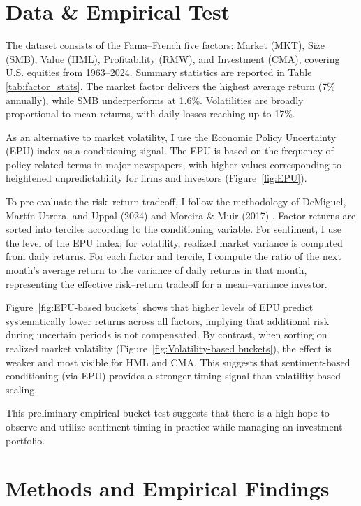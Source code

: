 \chapter{Data \& Empirical Test}

The dataset consists of the Fama–French five factors: Market (MKT), Size (SMB), Value (HML), Profitability (RMW), and Investment (CMA), covering U.S. equities from 1963–2024. Summary statistics are reported in Table \ref{tab:factor_stats}. The market factor delivers the highest average return (7\% annually), while SMB underperforms at 1.6\%. Volatilities are broadly proportional to mean returns, with daily losses reaching up to 17\%.

As an alternative to market volatility, I use the Economic Policy Uncertainty (EPU) index as a conditioning signal. The EPU is based on the frequency of policy-related terms in major newspapers, with higher values corresponding to heightened unpredictability for firms and investors (Figure~\ref{fig:EPU}).

To pre-evaluate the risk–return tradeoff, I follow the methodology of DeMiguel, Martín-Utrera, and Uppal (2024) and Moreira \& Muir (2017) \citep{moreira2017, demiguel2024}. Factor returns are sorted into terciles according to the conditioning variable. For sentiment, I use the level of the EPU index; for volatility, realized market variance is computed from daily returns. For each factor and tercile, I compute the ratio of the next month’s average return to the variance of daily returns in that month, representing the effective risk–return tradeoff for a mean–variance investor.

Figure~\ref{fig:EPU-based buckets} shows that higher levels of EPU predict systematically lower returns across all factors, implying that additional risk during uncertain periods is not compensated. By contrast, when sorting on realized market volatility (Figure~\ref{fig:Volatility-based buckets}), the effect is weaker and most visible for HML and CMA. This suggests that sentiment-based conditioning (via EPU) provides a stronger timing signal than volatility-based scaling.

This preliminary empirical bucket test suggests that there is a high hope to observe and utilize sentiment-timing in practice while managing an investment portfolio.

\chapter{Methods and Empirical Findings}

